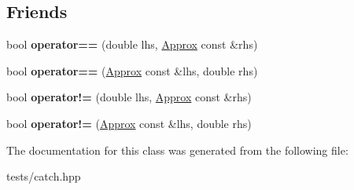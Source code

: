 \subsection*{Friends}
\begin{DoxyCompactItemize}
\item 
\mbox{\label{class_catch_1_1_detail_1_1_approx_ac766f044f1c63f0c5997982baefd9049}} 
bool {\bfseries operator==} (double lhs, \hyperlink{class_catch_1_1_detail_1_1_approx}{Approx} const \&rhs)
\item 
\mbox{\label{class_catch_1_1_detail_1_1_approx_a35999631e6cef569f9da9f3fa910db22}} 
bool {\bfseries operator==} (\hyperlink{class_catch_1_1_detail_1_1_approx}{Approx} const \&lhs, double rhs)
\item 
\mbox{\label{class_catch_1_1_detail_1_1_approx_a83b3763569a7ecc143c335b630be0e47}} 
bool {\bfseries operator!=} (double lhs, \hyperlink{class_catch_1_1_detail_1_1_approx}{Approx} const \&rhs)
\item 
\mbox{\label{class_catch_1_1_detail_1_1_approx_a7497ef839f8026cc0edd6269a80f3e09}} 
bool {\bfseries operator!=} (\hyperlink{class_catch_1_1_detail_1_1_approx}{Approx} const \&lhs, double rhs)
\end{DoxyCompactItemize}


The documentation for this class was generated from the following file\+:\begin{DoxyCompactItemize}
\item 
tests/catch.\+hpp\end{DoxyCompactItemize}
